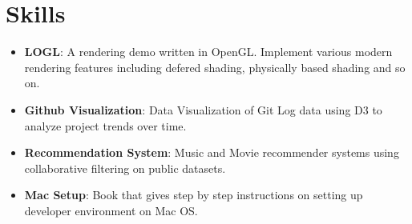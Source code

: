 \documentclass[letterpaper,11pt]{article}
\newcommand{\resumeItem}[2]{
	\item\small{
		\textbf{#1}{: #2 \vspace{-2pt}}
	}
}
\newcommand{\resumeSubItem}[2]{\resumeItem{#1}{#2}\vspace{-4pt}}
\newcommand{\resumeSubHeadingListStart}{\begin{itemize}[leftmargin=*]}
\newcommand{\resumeSubHeadingListEnd}{\end{itemize}}
\begin{document}
	\section{Skills}
	\resumeSubHeadingListStart
	\resumeSubItem{LOGL}
	{A rendering demo written in OpenGL. Implement various modern rendering features including defered shading, physically based shading and so on.}
	\resumeSubItem{Github Visualization}
	{Data Visualization of Git Log data using D3 to analyze project trends over time.}
	\resumeSubItem{Recommendation System}
	{Music and Movie recommender systems using collaborative filtering on public datasets.}
	\resumeSubItem{Mac Setup}
	{Book that gives step by step instructions on setting up developer environment on Mac OS.}
	\resumeSubHeadingListEnd
	
	
	
\end{document}
